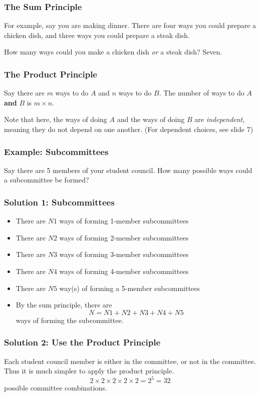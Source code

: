 \documentclass{beamer}
\newcommand{\<}{\langle}
\renewcommand{\>}{\rangle}
\begin{document}
\begin{frame}
\frametitle{The Sum Principle}

For example, say you are making dinner. There are four ways you could prepare a chicken dish, and three ways you could prepare a steak dish. \newline

How many ways could you make a chicken dish \emph{or} a steak dish? Seven.
\end{frame}

\begin{frame}
\frametitle{The Product Principle}

Say there are $m$ ways to do $A$ and $n$ ways to do $B$. {\color{red}The number of ways to do $A$ \textbf{and} $B$ is $m\times n$.} \newline

Note that here, the ways of doing $A$ and the ways of doing $B$ are \emph{independent}, meaning they do not depend on one another. (For dependent choices, see slide 7)
\end{frame}


\begin{frame}
\frametitle{Example: Subcommittees}

Say there are 5 members of your student council. How many possible ways could a subcommittee be formed?
\end{frame}

\begin{frame}
\frametitle{Solution 1: Subcommittees}

\begin{itemize}
\item There are $N1$ ways of forming 1-member subcommittees
\item There are $N2$ ways of forming 2-member subcommittees
\item There are $N3$ ways of forming 3-member subcommittees
\item There are $N4$ ways of forming 4-member subcommittees
\item There are $N5$ way(s) of forming a 5-member subcommittees
\item By the sum principle, there are
\[
N = N1+N2+N3+N4+N5
\]
ways of forming the subcommittee.
\end{itemize}
\end{frame}

\begin{frame}
\frametitle{Solution 2: Use the Product Principle}

Each student council member is either in the committee, or not in the committee. Thus it is much simpler to apply the product principle. 
\[
2 \times 2 \times 2 \times 2 \times 2= 2^5 = 32
\]
possible committee combinations.
\end{frame}
\end{document}
